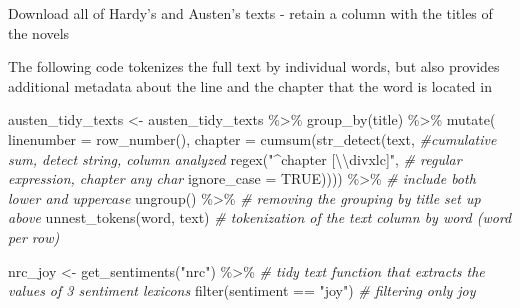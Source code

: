 \documentclass[
]{article}
\newenvironment{Shaded}{\begin{snugshade}}{\end{snugshade}}
\newcommand{\AttributeTok}[1]{\textcolor[rgb]{0.77,0.63,0.00}{#1}}
\newcommand{\CommentTok}[1]{\textcolor[rgb]{0.56,0.35,0.01}{\textit{#1}}}
\newcommand{\ConstantTok}[1]{\textcolor[rgb]{0.00,0.00,0.00}{#1}}
\newcommand{\FunctionTok}[1]{\textcolor[rgb]{0.00,0.00,0.00}{#1}}
\newcommand{\NormalTok}[1]{#1}
\newcommand{\OtherTok}[1]{\textcolor[rgb]{0.56,0.35,0.01}{#1}}
\newcommand{\SpecialCharTok}[1]{\textcolor[rgb]{0.00,0.00,0.00}{#1}}
\newcommand{\StringTok}[1]{\textcolor[rgb]{0.31,0.60,0.02}{#1}}
\begin{document}
Download all of Hardy's and Austen's texts - retain a column with the
titles of the novels

\begin{Shaded}
\end{Shaded}

The following code tokenizes the full text by individual words, but also
provides additional metadata about the line and the chapter that the
word is located in

\begin{Shaded}
\begin{Highlighting}[]
\NormalTok{austen\_tidy\_texts }\OtherTok{\textless{}{-}}\NormalTok{ austen\_tidy\_texts }\SpecialCharTok{\%\textgreater{}\%}
  \FunctionTok{group\_by}\NormalTok{(title) }\SpecialCharTok{\%\textgreater{}\%}
  \FunctionTok{mutate}\NormalTok{(}
    \AttributeTok{linenumber =} \FunctionTok{row\_number}\NormalTok{(),}
    \AttributeTok{chapter =} \FunctionTok{cumsum}\NormalTok{(}\FunctionTok{str\_detect}\NormalTok{(text,  }\CommentTok{\#cumulative sum, detect string, column analyzed}
                                \FunctionTok{regex}\NormalTok{(}\StringTok{"\^{}chapter [}\SpecialCharTok{\textbackslash{}\textbackslash{}}\StringTok{divxlc]"}\NormalTok{, }\CommentTok{\# regular expression, chapter any char}
                                      \AttributeTok{ignore\_case =} \ConstantTok{TRUE}\NormalTok{)))) }\SpecialCharTok{\%\textgreater{}\%} \CommentTok{\# include both lower and uppercase}
  \FunctionTok{ungroup}\NormalTok{() }\SpecialCharTok{\%\textgreater{}\%} \CommentTok{\# removing the grouping by title set up above}
  \FunctionTok{unnest\_tokens}\NormalTok{(word, text) }\CommentTok{\# tokenization of the text column by word (word per row)}

\NormalTok{nrc\_joy }\OtherTok{\textless{}{-}} \FunctionTok{get\_sentiments}\NormalTok{(}\StringTok{"nrc"}\NormalTok{) }\SpecialCharTok{\%\textgreater{}\%} \CommentTok{\# tidy text function that extracts the values of 3 sentiment lexicons}
  \FunctionTok{filter}\NormalTok{(sentiment }\SpecialCharTok{==} \StringTok{"joy"}\NormalTok{) }\CommentTok{\# filtering only joy}
\end{Highlighting}
\end{Shaded}
\end{document}
